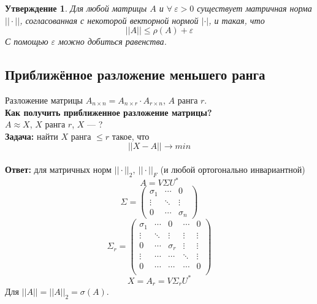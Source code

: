 \documentclass[12pt]{article}
\newtheorem*{statement}{Утверждение}
\begin{document}
	\begin{statement}
		Для любой матрицы $A$ и $\forall~ \varepsilon>0$ существует матричная норма $||\cdot ||$, согласованная с некоторой векторной нормой $|\cdot|$, и такая, что $$||A||\leqslant \rho(A) + \varepsilon$$
		С помощью $\varepsilon$ можно добиться равенства.
	\end{statement}
	
	\subsection{Приближённое разложение меньшего ранга}
	Разложение матрицы $A_{n \times n}=A_{n \times r} \cdot A_{r \times
		n}$, $A$ ранга $r$.\\
	\textbf{Как получить приближенное разложение матрицы?}\\
	$A\approx X$, $X$ ранга $r$, $X$ --- ?\\
	\textbf{Задача:} найти $X$ ранга $\leqslant r$ такое, что $$||X-A||\to min$$\\
	\textbf{Ответ:} для матричных норм $||\cdot||_2,~||\cdot||_F$ (и любой ортогонально инвариантной) $$A=V\Sigma U^*$$
	\[\Sigma=\begin{pmatrix}
	\sigma_1 & \cdots & 0\\
	\vdots & \ddots & \vdots\\
	0 & \cdots & \sigma_n
	\end{pmatrix}\]
	\[\Sigma_r=\begin{pmatrix}
	\sigma_1 & \cdots & 0  & \cdots & 0\\
	\vdots & \ddots & \vdots & \vdots & \vdots\\
	0 & \cdots & \sigma_r &  \vdots & \vdots\\
	\vdots & \cdots & \cdots & \ddots & \vdots\\
	0 & \cdots & \cdots & \cdots & 0\\
	\end{pmatrix}\]
	$$X=A_r=V\Sigma_r U^*$$
	Для $||A||=||A||_2=\sigma(A)$.
\end{document}
